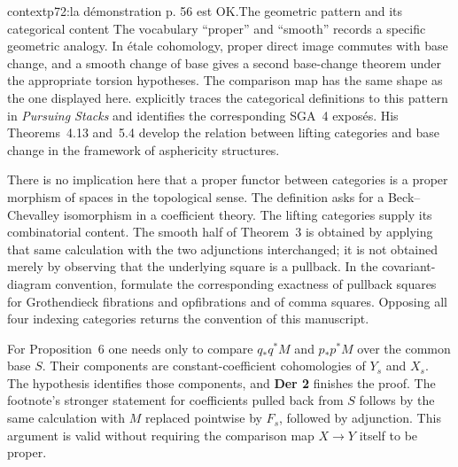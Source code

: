 \begin{dcomment}{context}{p72:la démonstration p. 56 est OK.}{The geometric pattern and its categorical content}
The vocabulary ``proper'' and ``smooth'' records a specific geometric analogy. In étale cohomology, proper direct image commutes with base change, and a smooth change of base gives a second base-change theorem under the appropriate torsion hypotheses. The comparison map has the same shape as the one displayed here. \citet[Introduction and Theorem~1.2]{Maltsiniotis2005Asphericite} explicitly traces the categorical definitions to this pattern in \emph{Pursuing Stacks} and identifies the corresponding SGA~4 exposés. His Theorems~4.13 and~5.4 develop the relation between lifting categories and base change in the framework of asphericity structures.

There is no implication here that a proper functor between categories is a proper morphism of spaces in the topological sense. The definition asks for a Beck--Chevalley isomorphism in a coefficient theory. The lifting categories supply its combinatorial content. The smooth half of Theorem~3 is obtained by applying that same calculation with the two adjunctions interchanged; it is not obtained merely by observing that the underlying square is a pullback. In the covariant-diagram convention, \citet[Propositions~1.24 and~1.26]{Groth2013} formulate the corresponding exactness of pullback squares for Grothendieck fibrations and opfibrations and of comma squares. Opposing all four indexing categories returns the convention of this manuscript.

For Proposition~6 one needs only to compare $q_*q^*M$ and $p_*p^*M$ over the common base $S$. Their components are constant-coefficient cohomologies of $Y_s$ and $X_s$. The hypothesis identifies those components, and \textbf{Der 2} finishes the proof. The footnote's stronger statement for coefficients pulled back from $S$ follows by the same calculation with $M$ replaced pointwise by $F_s$, followed by adjunction. This argument is valid without requiring the comparison map $X\to Y$ itself to be proper.
\end{dcomment}

